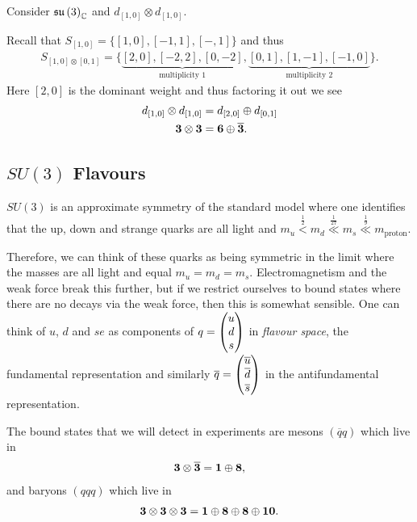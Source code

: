 \begin{example}
    Consider $\mathfrak{su}\left( 3 \right)_{\mathbb{C}}$ and $d_{\left[ 1,0 \right] } \otimes d_{\left[ 1,0 \right] }$.

    Recall that $S_{\left[ 1,0 \right] } = \{\left[ 1,0 \right] , \left[ -1,1 \right] , \left[ -,1 \right] \} $ and thus
    \begin{align}
        S_{\left[ 1,0 \right] \otimes \left[ 0,1 \right]} = \{\underbrace{\left[ 2,0 \right] , \left[ -2,2 \right] , \left[ 0,-2 \right]}_{\text{multiplicity 1}}, \underbrace{\left[ 0,1 \right] , \left[ 1,-1 \right] , \left[ -1,0 \right]}_{\text{multiplicity 2}}  \} 
    .\end{align}
    Here $\left[ 2,0 \right] $ is the dominant weight and thus factoring it out we see
    \begin{align}
        d_{\left[ 1,0 \right] }\otimes d_{\left[ 1,0 \right] } &= d_{\left[ 2,0 \right] } \oplus d_{\left[ 0,1 \right] } \\
        \vb{3} \otimes \vb{3} &= \vb{6} \oplus \overline{\vb{3}} 
    .\end{align}
\end{example}

\subsection{$SU\left( 3 \right)$ Flavours}

$SU\left( 3 \right) $ is an approximate symmetry of the standard model where one identifies that the up, down and strange quarks are all light and $m_u \overset{\frac{1}{2}}{<} m_d \overset{\frac{1}{27}}{\ll} m_s \overset{\frac{1}{9}}{\ll} m_\text{proton}$.

Therefore, we can think of these quarks as being symmetric in the limit where the masses are all light and equal $m_u = m_d = m_s$. Electromagnetism and the weak force break this further, but if we restrict ourselves to bound states where there are no decays via the weak force, then this is somewhat sensible. One can think of $u$, $d$ and $se$ as components of $q = \mqty( u \\ d \\ s)$ in \textit{flavour space}, the fundamental representation and similarly $\overline{q} = \mqty( \overline{u} \\ \overline{d} \\ \overline{s} )$ in the antifundamental representation.

The bound states that we will detect in experiments are mesons $\left( \overline{q} q \right) $ which live in
\begin{align}
    \vb{3} \otimes \overline{\vb{3}} = \vb{1} \oplus \vb{8}
,\end{align}
and baryons $\left( q q q \right) $ which live in
\begin{align}
    \vb{3} \otimes \vb{3} \otimes \vb{3} = \vb{1} \oplus \vb{8} \oplus \vb{8} \oplus \vb{10}
.\end{align}






